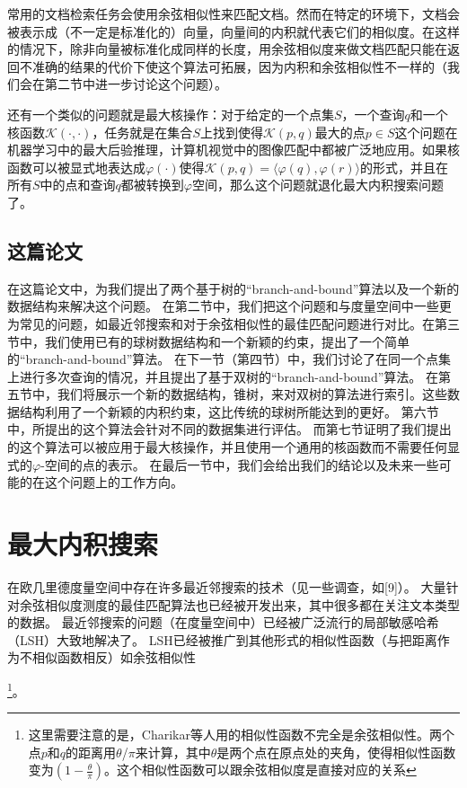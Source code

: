 \documentclass[twocolumn]{article}
\begin{document}
常用的文档检索任务会使用余弦相似性来匹配文档。然而在特定的环境下，文档会被表示成（不一定是标准化的）向量，向量间的内积就代表它们的相似度。在这样的情况下，除非向量被标准化成同样的长度，用余弦相似度来做文档匹配只能在返回不准确的结果的代价下使这个算法可拓展，因为内积和余弦相似性不一样的（我们会在第二节中进一步讨论这个问题）。

还有一个类似的问题就是最大核操作：对于给定的一个点集$S$，一个查询$q$和一个核函数$\mathcal{K}(\cdot,\cdot)$，任务就是在集合$S$上找到使得$\mathcal{K}(p,q)$最大的点$p \in S$这个问题在机器学习中的最大后验推理，计算机视觉中的图像匹配中都被广泛地应用。如果核函数可以被显式地表达成$\varphi(\cdot)$使得$\mathcal{K}(p,q) = \langle \varphi(q), \varphi(r) \rangle$的形式，并且在所有$S$中的点和查询$q$都被转换到$\varphi$空间，那么这个问题就退化最大内积搜索问题了。

\subsection{这篇论文}
在这篇论文中，为我们提出了两个基于树的“branch-and-bound”算法以及一个新的数据结构来解决这个问题。
在第二节中，我们把这个问题和与度量空间中一些更为常见的问题，如最近邻搜索和对于余弦相似性的最佳匹配问题进行对比。在第三节中，我们使用已有的球树数据结构和一个新颖的约束，提出了一个简单的“branch-and-bound”算法。
在下一节（第四节）中，我们讨论了在同一个点集上进行多次查询的情况，并且提出了基于双树的“branch-and-bound”算法。
在第五节中，我们将展示一个新的数据结构，锥树，来对双树的算法进行索引。这些数据结构利用了一个新颖的内积约束，这比传统的球树所能达到的更好。
第六节中，所提出的这个算法会针对不同的数据集进行评估。
而第七节证明了我们提出的这个算法可以被应用于最大核操作，并且使用一个通用的核函数而不需要任何显式的$\varphi$-空间的点的表示。
在最后一节中，我们会给出我们的结论以及未来一些可能的在这个问题上的工作方向。

\section{最大内积搜索}
在欧几里德度量空间中存在许多最近邻搜索的技术（见一些调查，如[9]）。 大量针对余弦相似度测度的最佳匹配算法也已经被开发出来，其中很多都在关注文本类型的数据。 最近邻搜索的问题（在度量空间中）已经被广泛流行的局部敏感哈希（LSH）大致地解决了。 LSH已经被推广到其他形式的相似性函数（与把距离作为不相似函数相反）如余弦相似性

\footnote{这里需要注意的是，Charikar等人用的相似性函数不完全是余弦相似性。两个点$p$和$q$的距离用$\theta$/$\pi$来计算，其中$\theta$是两个点在原点处的夹角，使得相似性函数变为$\left(1-\frac{\theta}{\pi}\right)$。这个相似性函数可以跟余弦相似度是直接对应的关系}。
\end{document}
